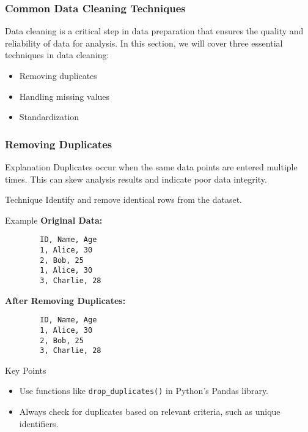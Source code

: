 \documentclass{beamer}
\begin{document}
\begin{frame}[fragile]
    \frametitle{Common Data Cleaning Techniques}
    Data cleaning is a critical step in data preparation that ensures the quality and reliability of data for analysis. In this section, we will cover three essential techniques in data cleaning:
    \begin{itemize}
        \item Removing duplicates
        \item Handling missing values
        \item Standardization
    \end{itemize}
\end{frame}

\begin{frame}[fragile]
    \frametitle{Removing Duplicates}
    \begin{block}{Explanation}
        Duplicates occur when the same data points are entered multiple times. This can skew analysis results and indicate poor data integrity.
    \end{block}
    
    \begin{block}{Technique}
        Identify and remove identical rows from the dataset.
    \end{block}
    
    \begin{block}{Example}
        \textbf{Original Data:}
        \begin{verbatim}
        ID, Name, Age
        1, Alice, 30
        2, Bob, 25
        1, Alice, 30
        3, Charlie, 28
        \end{verbatim}

        \textbf{After Removing Duplicates:}
        \begin{verbatim}
        ID, Name, Age
        1, Alice, 30
        2, Bob, 25
        3, Charlie, 28
        \end{verbatim}
    \end{block}
    
    \begin{block}{Key Points}
        \begin{itemize}
            \item Use functions like \texttt{drop\_duplicates()} in Python's Pandas library.
            \item Always check for duplicates based on relevant criteria, such as unique identifiers.
        \end{itemize}
    \end{block}
\end{frame}
\end{document}
